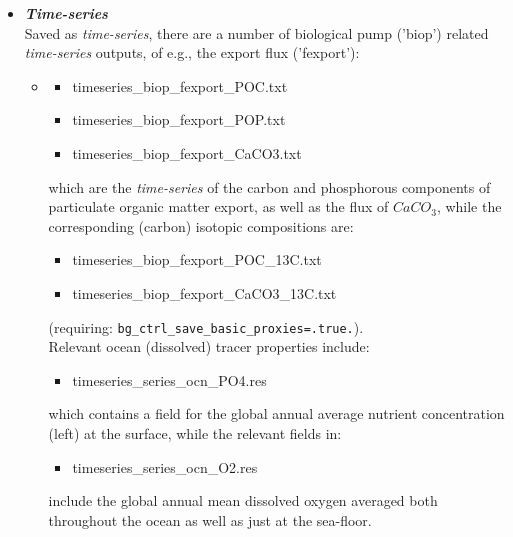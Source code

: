 \begin{itemize}[noitemsep]
\newpage
%
\vspace{2mm}
\item \textbf{\textit{Time-series}}
\vspace{1mm}
\\Saved as \textit{time-series}, there are a number of biological pump ('\textsf{\footnotesize biop}') related \textit{time-series} outputs, of e.g., the export flux ('\textsf{\footnotesize fexport}'): 
\vspace{1mm}
\begin{itemize}[noitemsep]
\item []
\begin{itemize}[noitemsep]
\item [] \textsf{\footnotesize timeseries\_biop\_fexport\_POC.txt}
\item [] \textsf{\footnotesize timeseries\_biop\_fexport\_POP.txt}
\item [] \textsf{\footnotesize timeseries\_biop\_fexport\_CaCO3.txt}
\end{itemize}
which are the \textit{time-series} of the carbon and phosphorous components of particulate organic matter export, as well as the flux of \(CaCO_{3}\), while the corresponding (carbon) isotopic compositions are:
\vspace{1mm}
\begin{itemize}[noitemsep]
\item [] \textsf{\footnotesize timeseries\_biop\_fexport\_POC\_13C.txt}
\item [] \textsf{\footnotesize timeseries\_biop\_fexport\_CaCO3\_13C.txt}
\end{itemize}
(requiring: \texttt{\small bg\_ctrl\_save\_basic\_proxies=.true.}).
\\Relevant ocean (dissolved) tracer properties include:
\begin{itemize}[noitemsep]
\item [] \textsf{\footnotesize timeseries\_series\_ocn\_PO4.res}
\end{itemize}
which contains a field for the global annual average nutrient concentration (left) at the surface, while the relevant fields in:
\begin{itemize}[noitemsep]
\item [] \textsf{\footnotesize timeseries\_series\_ocn\_O2.res}
\end{itemize}
include the global annual mean dissolved oxygen averaged both throughout the ocean as well as just at the sea-floor.
\end{itemize}


\end{itemize}
